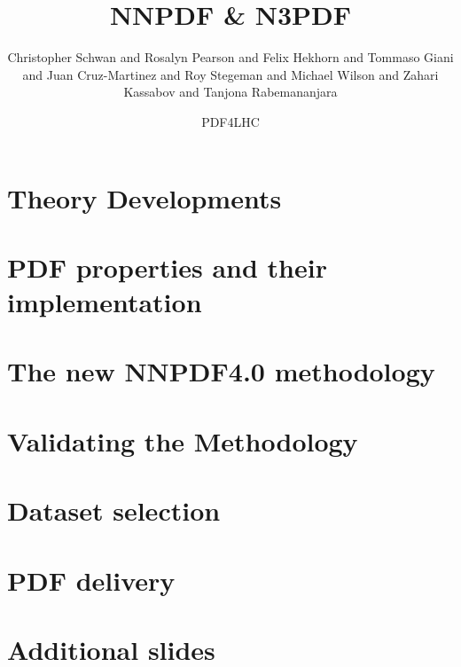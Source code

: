 \documentclass[xcolor={usenames,svgnames}]{beamer}
\author[NNPDF \& N3PDF]{
Christopher Schwan and
Rosalyn Pearson and
Felix Hekhorn and
Tommaso Giani and
Juan Cruz-Martinez and
Roy Stegeman and
Michael Wilson and
Zahari Kassabov and
Tanjona Rabemananjara
}
\date{PDF4LHC}
\begin{document}
\title{NNPDF \& N3PDF}
\section{Theory Developments}



\section{PDF properties and their implementation}



\section{The new NNPDF4.0 methodology}



\section{Validating the Methodology}



\section{Dataset selection}


\section{PDF delivery}


\appendix

\section{Additional slides}




\end{document}
